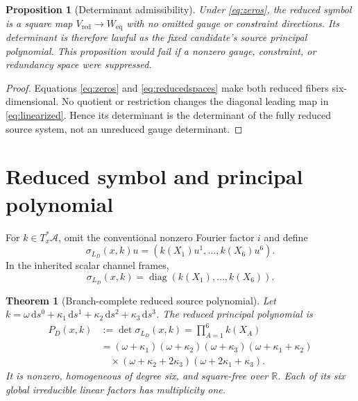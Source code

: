 \documentclass[11pt]{article}
\newcommand{\A}{\mathcal A}
\newcommand{\R}{\mathbb R}
\newcommand{\Vred}{V_{\mathrm{red}}}
\newcommand{\Eeq}{W_{\mathrm{eq}}}
\newcommand{\sigmaL}{\sigma_{L_D}}
\newtheorem{proposition}{Proposition}
\newtheorem{theorem}{Theorem}
\begin{document}
\begin{proposition}[Determinant admissibility]
Under \eqref{eq:zeros}, the reduced symbol is a square map
$\Vred\to\Eeq$ with no omitted gauge or constraint directions.  Its
determinant is therefore lawful as the fixed candidate's source principal
polynomial.  This proposition would fail if a nonzero gauge, constraint, or
redundancy space were suppressed.
\end{proposition}

\begin{proof}
Equations \eqref{eq:zeros} and \eqref{eq:reducedspaces} make both reduced
fibers six-dimensional.  No quotient or restriction changes the diagonal
leading map in \eqref{eq:linearized}.  Hence its determinant is the
determinant of the fully reduced source system, not an unreduced gauge
determinant.
\end{proof}

\section{Reduced symbol and principal polynomial}

For $k\in T_x^*\A$, omit the conventional nonzero Fourier factor $i$ and
define
\begin{equation}
 \sigmaL(x,k)u
 =\left(k(X_1)u^1,\ldots,k(X_6)u^6\right).
 \label{eq:symbol}
\end{equation}
In the inherited scalar channel frames,
\begin{equation}
 \sigmaL(x,k)=\operatorname{diag}
 \left(k(X_1),\ldots,k(X_6)\right).
 \label{eq:matrix}
\end{equation}

\begin{theorem}[Branch-complete reduced source polynomial]
Let $k=\omega\,\mathrm ds^0+\kappa_1\,\mathrm ds^1+
\kappa_2\,\mathrm ds^2+\kappa_3\,\mathrm ds^3$.  The reduced principal
polynomial is
\begin{align}
 P_D(x,k)&:=\det\sigmaL(x,k)=\prod_{A=1}^6 k(X_A)
 \label{eq:abstractpoly}\\
 &= (\omega+\kappa_1)(\omega+\kappa_2)(\omega+\kappa_3)
 (\omega+\kappa_1+\kappa_2)\nonumber\\
 &\quad\times(\omega+\kappa_2+2\kappa_3)
 (\omega+2\kappa_1+\kappa_3).
 \label{eq:explicitpoly}
\end{align}
It is nonzero, homogeneous of degree six, and square-free over $\R$.  Each of
its six global irreducible linear factors has multiplicity one.
\end{theorem}
\end{document}
